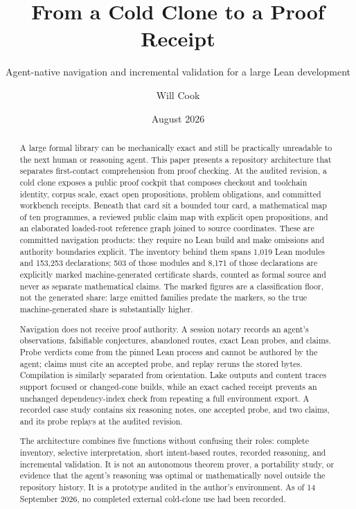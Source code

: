 \documentclass[11pt]{article}
\title{From a Cold Clone to a Proof Receipt}
\subtitle{Agent-native navigation and incremental validation for a large Lean development}
\author{Will Cook}
\date{August 2026}
\begin{document}
\maketitle
\paperprovenance

\begin{abstract}
A large formal library can be mechanically exact and still be practically
unreadable to the next human or reasoning agent. This paper presents a
repository architecture that separates first-contact comprehension from proof
checking. At the audited revision, a cold clone exposes a public proof cockpit
that composes checkout and toolchain identity, corpus scale, exact open
propositions, problem obligations, and committed workbench receipts. Beneath
that card sit a bounded tour card, a mathematical map of ten programmes, a
reviewed public claim map with explicit open propositions, and an
elaborated loaded-root reference graph joined to source coordinates. These are
committed navigation products: they require no Lean build and make omissions
and authority boundaries explicit.
The inventory behind them spans 1,019 Lean modules and 153,253 declarations;
503 of those modules and 8,171 of those declarations are explicitly marked
machine-generated certificate shards, counted as formal source and never as
separate mathematical claims.  The marked figures are a classification
floor, not the generated share: large emitted families predate the markers,
so the true machine-generated share is substantially higher.

Navigation does not receive proof authority. A session notary records an
agent's observations, falsifiable conjectures, abandoned routes, exact Lean
probes, and claims. Probe verdicts come from the pinned Lean process and cannot
be authored by the agent; claims must cite an accepted probe, and replay reruns
the stored bytes. Compilation is similarly separated from orientation. Lake
outputs and content traces support focused or changed-cone builds, while an
exact cached receipt prevents an unchanged dependency-index check from
repeating a full environment export. A recorded case study contains six reasoning
notes, one accepted probe, and two claims, and its probe replays at the audited
revision.

The architecture combines five functions without confusing their roles:
complete inventory, selective interpretation, short intent-based routes,
recorded reasoning, and incremental validation. It is not an autonomous theorem
prover, a portability study, or evidence that the agent's reasoning was optimal
or mathematically novel outside the repository history. It is a prototype
audited in the author's environment. As of 14 September 2026, no completed
external cold-clone use had been recorded.
\end{abstract}
\end{document}

